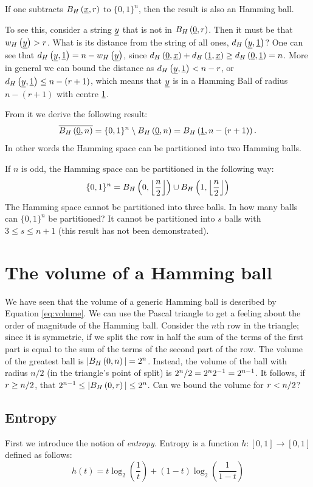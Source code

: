 If one subtracts $B_H\left(\underline{x}, r\right)$ to $\{0, 1\}^n$, then the result is also an Hamming ball.

To see this, consider a string $\underline{y}$ that is not in $B_H\left(\underline{0}, r\right)$.
Then it must be that $w_H\left(\underline{y}\right) > r$.
What is its distance from the string of all ones, \ie $d_H \left({\underline{y},\underline{1}}\right)$?
One can see that $d_H \left({\underline{y},\underline{1}}\right) = n - w_H\left(\underline{y}\right)$, since $d_H \left({\underline{0},\underline{x}}\right) + d_H \left({\underline{1},\underline{x}}\right) \ge d_H \left({\underline{0},\underline{1}}\right) = n$.
More in general we can bound the distance as $d_H \left({\underline{y},\underline{1}}\right) < n - r$, or $d_H \left({\underline{y},\underline{1}}\right) \le n - (r+1)$, which means that $\underline{y}$ is in a Hamming Ball of radius $n - (r+1)$ with centre $\underline{1}$.

From it we derive the following result:
\begin{equation}
	\overline{B_H\left(\underline{0}, n\right)} = \{0,1\}^{n} \setminus B_H\left(\underline{0}, n\right) = B_H\left(\underline{1}, n - (r+1)\right).
\end{equation}
In other words the Hamming space can be partitioned into two Hamming balls.

If $n$ is odd, the Hamming space can be partitioned in the following way: $$\{0, 1\}^n = B_H\left(0, \left\lfloor{\frac{n}{2}}\right\rfloor\right) \cup B_H\left(1, \left\lfloor{\frac{n}{2}}\right\rfloor\right)$$
The Hamming space cannot be partitioned into three balls.
In how many balls can $\{0, 1\}^n$ be partitioned?
It cannot be partitioned into $s$ balls with $3 \leq s \leq n + 1$ (this result has not been demonstrated).

\section{The volume of a Hamming ball}
We have seen that the volume of a generic Hamming ball is described by Equation \ref{eq:volume}. We can use the Pascal triangle to get a feeling about the order of magnitude of the Hamming ball. Consider the $n$th row in the triangle; since it is symmetric, if we split the row in half the sum of the terms of the first part is equal to the sum of the terms of the second part of the row. The volume of the greatest ball is $|B_H\left(0, n\right)| = 2^n$. Instead, the volume of the ball with radius $n/2$ (in the triangle's point of split) is ${2^n}/{2} = 2^n2^{-1} = 2^{n-1}$. It follows, if $r \geq {n}/{2}$, that $2^{n-1} \leq |B_H\left(0, r\right)| \leq 2^n$. Can we bound the volume for $r < {n}/{2}$?

\subsection{Entropy}
First we introduce the notion of \emph{entropy}. Entropy is a function $h: [0, 1] \rightarrow [0, 1]$ defined as follows:
\begin{equation}
	h(t) = t\log_2(\dfrac{1}{t}) + (1 - t)\log_2\left(\dfrac{1}{1-t}\right)
\end{equation}

